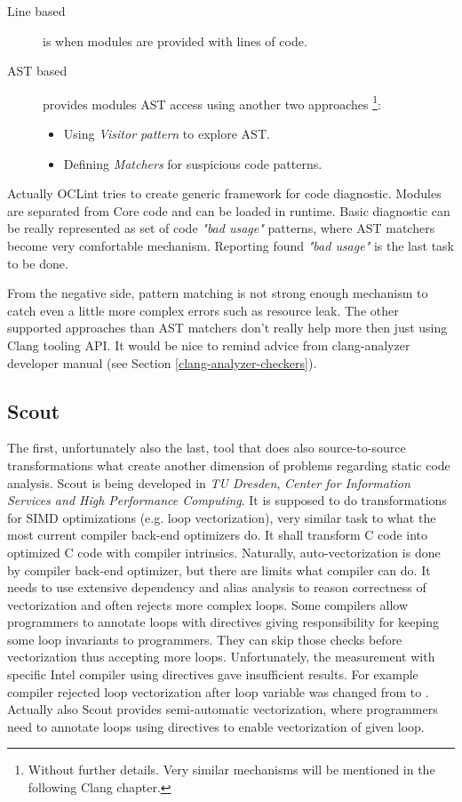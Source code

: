 \begin{description}
\item[Line based] is when modules are provided with lines of code.
\item[AST based] provides modules AST access using another two approaches  \footnote{Without further details. Very similar mechanisms will be mentioned in the following Clang chapter.}:
	\begin{itemize}
	\item Using \emph{Visitor pattern} to explore AST.
	\item Defining \emph{Matchers} for suspicious code patterns.
	\end{itemize}
\end{description}

Actually OCLint tries to create generic framework for code diagnostic. Modules are separated from Core code and can be loaded in runtime. Basic diagnostic can be really represented as set of code \textit{"bad usage"} patterns, where AST matchers become very comfortable mechanism. Reporting found \textit{"bad usage"} is the last task to be done.

From the negative side, pattern matching is not strong enough mechanism to catch even a little more complex errors such as resource leak. The other supported approaches than AST matchers don't really help more then just using Clang tooling API. It would be nice to remind advice from clang-analyzer developer manual (see Section \ref{clang-analyzer-checkers}).

\subsection{Scout}
The first, unfortunately also the last, tool that does also source-to-source transformations what create another dimension of problems regarding static code analysis. Scout is being developed in \emph{TU Dresden}, \emph{Center for Information Services and High Performance Computing}. It is supposed to do transformations for SIMD optimizations (e.g. loop vectorization), very similar task to what the most current compiler back-end optimizers do. It shall transform C code into optimized C code with compiler intrinsics. Naturally, auto-vectorization is done by compiler back-end optimizer, but there are limits what compiler can do. It needs to use extensive dependency and alias analysis to reason correctness of vectorization and often rejects more complex loops. Some compilers allow programmers to annotate loops with  directives giving responsibility for keeping some loop invariants to programmers. They can skip those checks before vectorization thus accepting more loops. Unfortunately, the measurement with specific Intel compiler using  directives gave insufficient results. For example compiler rejected loop vectorization after loop variable was changed from  to . Actually also Scout provides semi-automatic vectorization, where programmers need to annotate loops using  directives to enable vectorization of given loop. 

